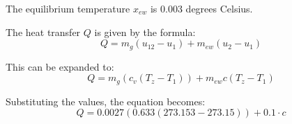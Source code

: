 The equilibrium temperature \( x_{ew} \) is 0.003 degrees Celsius.

The heat transfer \( Q \) is given by the formula:
\[ Q = m_g (u_{12} - u_1) + m_{ew} (u_2 - u_1) \]

This can be expanded to:
\[ Q = m_g (c_v (T_{z} - T_1)) + m_{ew} c (T_{z} - T_1) \]

Substituting the values, the equation becomes:
\[ Q = 0.0027 (0.633 (273.153 - 273.15)) + 0.1 \cdot c \]